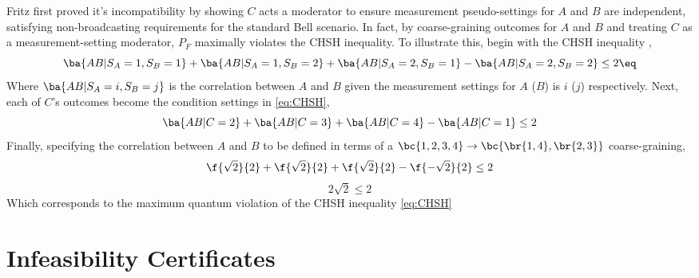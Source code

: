 \documentclass[aps, 10pt, english, twoside, pra, longbibliography]{revtex4-1}
\theoremstyle{plain}
\theoremstyle{definition}
\theoremstyle{remark}
\begin{document}
    Fritz first proved it's incompatibility \cite{Fritz_2012} by showing $C$ acts a moderator to ensure measurement pseudo-settings for $A$ and $B$ are independent, satisfying non-broadcasting requirements for the standard Bell scenario. In fact, by coarse-graining outcomes for $A$ and $B$ and treating $C$ as a measurement-setting moderator, $P_F$ maximally violates the CHSH inequality. To illustrate this, begin with the CHSH inequality \cite{CHSH_Original},
    \[ \ba{AB|S_A=1, S_B=1} + \ba{AB|S_A=1, S_B=2} + \ba{AB|S_A=2, S_B=1} - \ba{AB|S_A=2, S_B=2} \leq 2 \eq \label{eq:CHSH}\]
    Where $\ba{AB|S_A=i, S_B=j}$ is the correlation between $A$ and $B$ given the measurement settings for $A$ ($B$) is $i$ ($j$) respectively. Next, each of $C$'s outcomes become the condition settings in \cref{eq:CHSH},
    \[ \ba{AB|C=2} + \ba{AB|C=3} + \ba{AB|C=4} - \ba{AB|C=1} \leq 2 \]
    Finally, specifying the correlation between $A$ and $B$ to be defined in terms of a $\bc{1,2,3,4} \rightarrow \bc{\br{1,4}, \br{2,3}}$ coarse-graining,
    \[ \f{\sqrt{2}}{2} + \f{\sqrt{2}}{2} + \f{\sqrt{2}}{2} - \f{-\sqrt{2}}{2} \leq 2 \]
    \[ 2\sqrt{2} \leq 2 \]
    Which corresponds to the maximum quantum violation of the CHSH inequality \cref{eq:CHSH}

    \section{Infeasibility Certificates}
\end{document}
